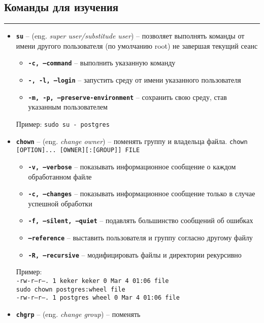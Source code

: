 \documentclass[12pt, a4paper]{article}
\begin{document}
\subsection{Команды для изучения}
\par\noindent\rule{\textwidth}{0.4pt}
\begin{itemize}
  \item \textbf{\texttt{su}} -- (eng. \textit{super user/substitude user}) --
    позволяет выполнять команды от имени другого пользователя (по умолчанию 
    root) не завершая текущий сеанс
  \begin{itemize}
    \item \textbf{\texttt{-c, --command}} -- выполнить указанную команду
    \item \textbf{\texttt{-, -l, --login}} -- запустить среду от имени
      указанного пользователя
    \item \textbf{\texttt{-m, -p, --preserve-environment}} -- сохранить
      свою среду, став указанным пользователем
  \end{itemize}
  Пример: \texttt{sudo su - postgres}
  \item \textbf{\texttt{chown}} -- (eng. \textit{change owner}) -- поменять
    группу и владельца файла. \texttt{chown [OPTION]... [OWNER][:[GROUP]] FILE}
  \begin{itemize}
    \item \textbf{\texttt{-v, --verbose}} -- показывать информационное сообщение
      о каждом обработанном файле
    \item \textbf{\texttt{-c, --changes}} -- показывать информационное сообщение
      только в случае успешной обработки
    \item \textbf{\texttt{-f, --silent, --quiet}} -- подавлять большинство
      сообщений об ошибках
    \item \textbf{\texttt{--reference}} -- выставить пользователя и группу
      согласно другому файлу
    \item \textbf{\texttt{-R, --recursive}} -- модифицировать файлы и директории
      рекурсивно
  \end{itemize}
  Пример:\\
  \texttt{-rw-r--r--. 1 keker keker     0 Mar  4 01:06 file}\\
  \texttt{sudo chown postgres:wheel file}\\
  \texttt{-rw-r--r--. 1 postgres wheel     0 Mar  4 01:06 file}\\
  \item \textbf{\texttt{chgrp}} -- (eng. \textit{change group}) -- поменять

\end{itemize}
\end{document}
